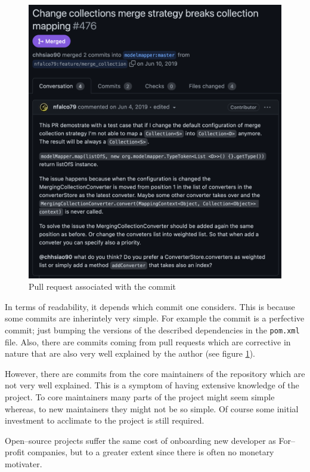 \documentclass[12pt]{article}
\begin{document}
\begin{figure}[H]
    \centering
    \includegraphics[width=14cm]{images/pull-request.png}
    \caption{Pull request associated with the  commit}
    \label{pull-request}
\end{figure}

In terms of readability, it depends which commit one considers.
This is because some commits are inherintely very simple. For
example the  commit is a perfective commit; just bumping
the versions of the described dependencies in the
\texttt{pom.xml} file. Also, there are commits coming from pull
requests which are corrective in nature that are also very well
explained by the author (see figure \ref{pull-request}).

However, there are commits from the core maintainers of the
repository which are not very well explained. This is a symptom
of having extensive knowledge of the project. To core
maintainers many parts of the project might seem simple whereas,
to new maintainers they might not be so simple. Of course some
initial investment to acclimate to the project is still
required.

Open--source projects suffer the same cost of onboarding new
developer as For--profit companies, but to a greater extent
since there is often no monetary motivater.
\end{document}
